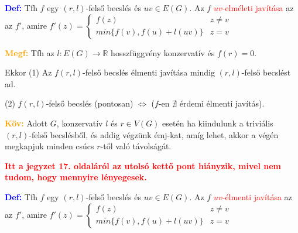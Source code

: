 \documentclass[../szamtud.tex]{subfiles}
\begin{document}
			\textbf{\textcolor{blue}{Def:}} Tfh $f$ egy $(r,l)$-felső becslés és $uv \in E(G)$. Az $f$ \textcolor{red}{$uv$-elméleti javítása} az az $f'$, amire 
			$
				f'(z) = \begin{cases}
					f(z) & z \neq v \\
					min\{f(v), f(u) + l(uv)\} & z = v
				\end{cases}
			$

			\textbf{\textcolor{orange}{Megf:}} Tfh az $l:E(G)\rightarrow \mathbb{R}$ hosszfüggvény konzervatív és $f(r) = 0$. 
			
			Ekkor (1) Az $f (r,l)$-felső becslés élmenti javítása mindig $(r,l)$-felső becslést ad.


			(2) $f (r,l)$-felső becslés (pontosan) $\Longleftrightarrow$ ($f$-en $\nexists$ érdemi élmenti javítás).


			\textbf{\textcolor{orange}{Köv:}} Adott $G$, konzervatív $l$ és $r \in V(G)$ esetén ha kiindulunk a triviális $(r,l)$-felső becslésből, és addig végzünk émj-kat, amíg lehet, akkor a végén megkapjuk minden csúcs $r$-től való távolságát.

			\textbf{\textcolor{red}{Itt a jegyzet 17. oldaláról az utolsó kettő pont hiányzik, mivel nem tudom, hogy mennyire lényegesek.}}

			\textbf{\textcolor{blue}{Def:}} Tfh $f$ egy $(r,l)$-felső becslés és $uv \in E(G)$. Az $f$ \textcolor{red}{$uv$-élmenti javítása} az az $f'$, amire 
			$
				f'(z) = \begin{cases}
					f(z) & z \neq v \\
					min\{f(v), f(u) + l(uv)\} & z = v
				\end{cases}
			$
\end{document}
